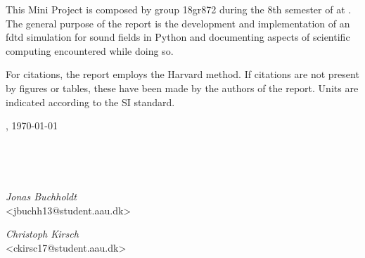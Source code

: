 This Mini Project is composed by group 18gr872 during the 8th semester of \projectFaculty{} at \AAU{}. The general purpose of the report is the development and implementation of an \gls{fdtd} simulation for sound fields in Python and documenting aspects of scientific computing encountered while doing so. 

For citations, the report employs the Harvard method. If citations are not present by figures or tables, these have been made by the authors of the report. Units are indicated according to the SI standard.



\vspace{\baselineskip}\hfill \AAU, \today
\vfill\noindent
\begin{center}
\begin{minipage}[b]{0.45\textwidth}
 \centering
  \textit{}\\
 {}
\end{minipage}
\hspace{0.3cm}
\begin{minipage}[b]{0.45\textwidth}
 \centering
  \textit{}\\
 {}
\end{minipage}
\end{center}
\vspace{1\baselineskip}
\begin{center}
\begin{minipage}[b]{0.45\textwidth}
 \centering
  \textit{Jonas Buchholdt}\\
 {\footnotesize <jbuchh13@student.aau.dk>}
\end{minipage}
\hspace{0.3cm}
\begin{minipage}[b]{0.45\textwidth}
 \centering
  \textit{Christoph Kirsch}\\
 {\footnotesize <ckirsc17@student.aau.dk>}
\end{minipage}
\end{center}

